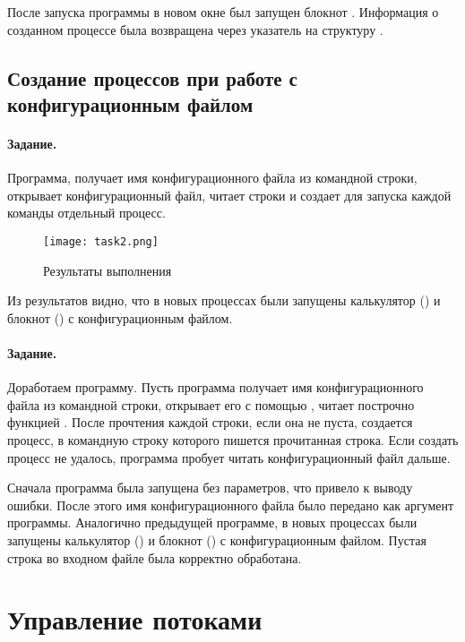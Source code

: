 После запуска программы в новом окне был запущен блокнот . Информация о созданном процессе была возвращена через указатель на структуру .

\subsection{Создание процессов при работе с конфигурационным файлом}

\paragraph{Задание.} Программа, получает имя конфигурационного файла из командной строки, открывает конфигурационный файл, читает строки и создает для запуска каждой команды отдельный процесс.


\begin{figure}[H]
	\texttt{[image: task2.png]}
	\caption{Результаты выполнения }
\end{figure}

Из результатов видно, что в новых процессах были запущены калькулятор () и блокнот () с конфигурационным файлом.

\paragraph{Задание.} Доработаем программу. Пусть программа получает имя конфигурационного файла из командной строки, открывает его с помощью , читает построчно функцией . После прочтения каждой строки, если она не пуста, создается процесс, в командную строку которого пишется прочитанная строка. Если создать процесс не удалось, программа пробует читать конфигурационный файл дальше.


Сначала программа была запущена без параметров, что привело к выводу ошибки. После этого имя конфигурационного файла было передано как аргумент программы. Аналогично предыдущей программе, в новых процессах были запущены калькулятор () и блокнот () с конфигурационным файлом. Пустая строка во входном файле была корректно обработана.

\newpage

\section{Управление потоками}

